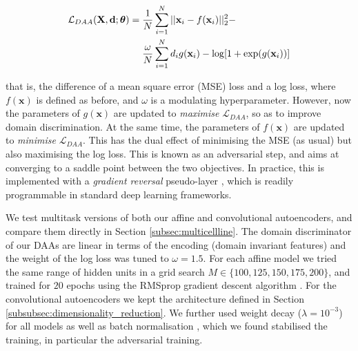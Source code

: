 \begin{align}\label{equ:da}
\mathcal{L}_{DAA}(\mathbf{X}, \mathbf{d} ; \boldsymbol\theta) ={} & \frac{1}{N}\sum_{i=1}^N||\mathbf{x}_i - f(\mathbf{x}_i)||_2^2 - \\ \notag
& \frac{\omega}{N}\sum_{i=1}^N d_ig(\mathbf{x}_i) - \log[1 + \exp(g(\mathbf{x}_i))] \notag
\end{align}


that is, the difference of a mean square error (MSE) loss and a log loss, where $f(\mathbf{x})$ is defined as before, and $\omega$ is a modulating hyperparameter. However, now the parameters of $g(\mathbf{x})$ are updated to \emph{maximise} $\mathcal{L}_{DAA}$, so as to improve domain discrimination. At the same time, the parameters of $f(\mathbf{x})$ are updated to \emph{minimise} $\mathcal{L}_{DAA}$. This has the dual effect of minimising the MSE (as usual) but also maximising the log loss. This is known as an adversarial step, and aims at converging to a saddle point between the two objectives. In practice, this is implemented with a \emph{gradient reversal} pseudo-layer \cite{ganin2016domain}, which is readily programmable in standard deep learning frameworks.

We test multitask versions of both our affine and convolutional autoencoders, and compare them directly in Section \ref{subsec:multicellline}. The domain discriminator of our DAAs are linear in terms of the encoding (domain invariant features) and the weight of the log loss was tuned to $\omega = 1.5$. For each affine model we tried the same range of hidden units in a grid search $M \in \{100, 125, 150, 175, 200\}$, and trained for $20$ epochs using the RMSprop gradient descent algorithm \cite{tieleman2012lecture}. For the convolutional autoencoders we kept the architecture defined in Section \ref{subsubsec:dimensionality_reduction}. We further used weight decay ($\lambda = 10^{-3}$) for all models as well as batch normalisation \cite{ioffe2015batch}, which we found stabilised the training, in particular the adversarial training.

